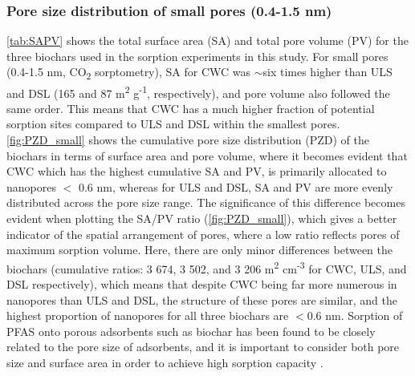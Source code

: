 \subsubsection{Pore size distribution of small pores (0.4-1.5 nm)}
\cref{tab:SAPV} shows the total surface area (SA) and total pore volume (PV) for the three biochars used in the sorption experiments in this study. For small pores (0.4-1.5 nm, CO\textsubscript{2} sorptometry), SA for CWC was $\sim$six times higher than ULS and DSL (165 and 87  m\textsuperscript{2} g\textsuperscript{-1}, respectively), and pore volume also followed the same order. This means that CWC has a much higher fraction of potential sorption sites compared to ULS and DSL within the smallest pores. \cref{fig:PZD_small} shows the cumulative pore size distribution (PZD) of the biochars in terms of surface area and pore volume, where it becomes evident that CWC which has the highest cumulative SA and PV, is primarily allocated to nanopores $<$ 0.6 nm, whereas for ULS and DSL, SA and PV are more evenly distributed across the pore size range. The significance of this difference becomes evident when plotting the SA/PV ratio (\cref{fig:PZD_small}), which gives a better indicator of the spatial arrangement of pores, where a low ratio reflects pores of maximum sorption volume. Here, there are only minor differences between the biochars (cumulative ratios: 3 674, 3 502, and 3 206 m\textsuperscript{2} cm\textsuperscript{-3} for CWC, ULS, and DSL respectively), which means that despite CWC being far more numerous in nanopores than ULS and DSL, the structure of these pores are similar, and the highest proportion of nanopores for all three biochars are $<$0.6 nm. Sorption of PFAS onto porous adsorbents such as biochar has been found to be closely related to the pore size of adsorbents, and it is important to consider both pore size and surface area in order to achieve high sorption capacity \citep{du2014adsorption}. 

